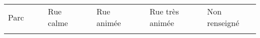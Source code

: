 \begin{table}[t]
\vspace{0.5cm}


\begin{tabular}{|p{1.5cm}|l|p{0.001cm}|p{2cm}|l|p{0.001cm}|p{2cm}|l|p{0.001cm}|p{2.75cm}|l|p{0.001cm}|p{2.45cm}|l|}

\hhline{|-|-|~|-|-|~|-|-|~|-|-|~|-|-|}
Parc & {\cellcolor[HTML]{5AB25A}} & & Rue calme & {\cellcolor[HTML]{FFCB2F}} & & Rue animée & {\cellcolor[HTML]{F56B00}} & &  Rue très animée & {\cellcolor[HTML]{9A0000}} & & Non renseigné & \\
\hhline{|-|-|~|-|-|~|-|-|~|-|-|~|-|-|}

\end{tabular}
\label{tab:classificationScene}
\end{table}